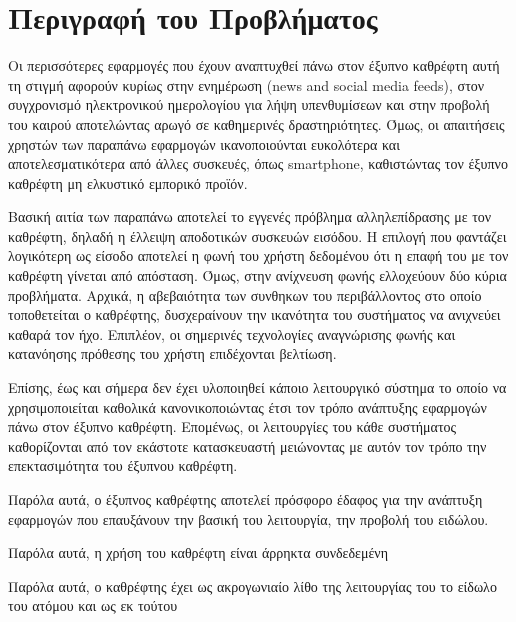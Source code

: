 \section{Περιγραφή του Προβλήματος}
\label{section:problem_description}

Οι περισσότερες εφαρμογές που έχουν αναπτυχθεί πάνω στον έξυπνο καθρέφτη αυτή τη στιγμή αφορούν κυρίως στην ενημέρωση (news and social media feeds), στον συγχρονισμό ηλεκτρονικού ημερολογίου για λήψη υπενθυμίσεων και στην προβολή του καιρού αποτελώντας αρωγό σε καθημερινές δραστηριότητες. Όμως, οι απαιτήσεις χρηστών των παραπάνω εφαρμογών ικανοποιούνται ευκολότερα και αποτελεσματικότερα από άλλες συσκευές, όπως smartphone, καθιστώντας τον έξυπνο καθρέφτη μη ελκυστικό εμπορικό προϊόν. 

Βασική αιτία των παραπάνω αποτελεί το εγγενές πρόβλημα αλληλεπίδρασης με τον καθρέφτη, δηλαδή η έλλειψη αποδοτικών συσκευών εισόδου. Η επιλογή που φαντάζει λογικότερη ως είσοδο αποτελεί η φωνή του χρήστη δεδομένου ότι η επαφή του με τον καθρέφτη γίνεται από απόσταση. Όμως, στην ανίχνευση φωνής ελλοχεύουν δύο κύρια προβλήματα. Αρχικά, η αβεβαιότητα των συνθηκων του περιβάλλοντος στο οποίο τοποθετείται ο καθρέφτης, δυσχεραίνουν την ικανότητα του συστήματος να ανιχνεύει καθαρά τον ήχο. Επιπλέον, οι σημερινές τεχνολογίες αναγνώρισης φωνής και κατανόησης πρόθεσης του χρήστη επιδέχονται βελτίωση.

Επίσης, έως και σήμερα δεν έχει υλοποιηθεί κάποιο λειτουργικό σύστημα το οποίο να χρησιμοποιείται καθολικά κανονικοποιώντας έτσι τον τρόπο ανάπτυξης εφαρμογών πάνω στον έξυπνο καθρέφτη. Επομένως, οι λειτουργίες του κάθε συστήματος καθορίζονται από τον εκάστοτε κατασκευαστή μειώνοντας με αυτόν τον τρόπο την επεκτασιμότητα του έξυπνου καθρέφτη.

Παρόλα αυτά, ο έξυπνος καθρέφτης αποτελεί πρόσφορο έδαφος για την ανάπτυξη εφαρμογών που επαυξάνουν την βασική του λειτουργία, την προβολή του ειδώλου.

Παρόλα αυτά, η χρήση του καθρέφτη είναι άρρηκτα συνδεδεμένη 

Παρόλα αυτά, ο καθρέφτης έχει ως ακρογωνιαίο λίθο της λειτουργίας του το είδωλο του ατόμου και ως εκ τούτου 

 